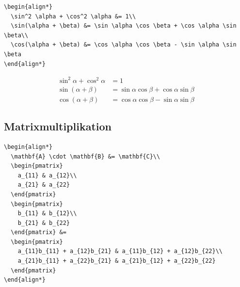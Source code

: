 \documentclass[12pt,a4paper]{article}
\begin{document}
\begin{lstlisting}[style=latex]
\begin{align*}
  \sin^2 \alpha + \cos^2 \alpha &= 1\\
  \sin(\alpha + \beta) &= \sin \alpha \cos \beta + \cos \alpha \sin \beta\\
  \cos(\alpha + \beta) &= \cos \alpha \cos \beta - \sin \alpha \sin \beta
\end{align*}
\end{lstlisting}

\begin{ausgabe}
\begin{align*}
  \sin^2 \alpha + \cos^2 \alpha &= 1\\
  \sin(\alpha + \beta) &= \sin \alpha \cos \beta + \cos \alpha \sin \beta\\
  \cos(\alpha + \beta) &= \cos \alpha \cos \beta - \sin \alpha \sin \beta
\end{align*}
\end{ausgabe}



\subsection{Matrixmultiplikation}

\begin{lstlisting}[style=latex]
\begin{align*}
  \mathbf{A} \cdot \mathbf{B} &= \mathbf{C}\\
  \begin{pmatrix}
    a_{11} & a_{12}\\
    a_{21} & a_{22}
  \end{pmatrix}
  \begin{pmatrix}
    b_{11} & b_{12}\\
    b_{21} & b_{22}
  \end{pmatrix} &=
  \begin{pmatrix}
    a_{11}b_{11} + a_{12}b_{21} & a_{11}b_{12} + a_{12}b_{22}\\
    a_{21}b_{11} + a_{22}b_{21} & a_{21}b_{12} + a_{22}b_{22}
  \end{pmatrix}
\end{align*}
\end{lstlisting}
\end{document}
